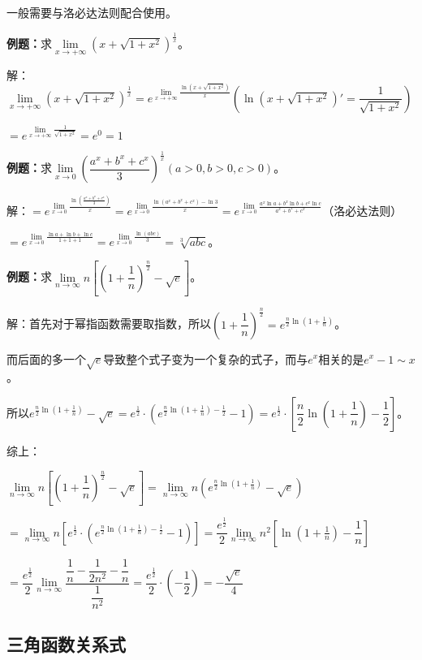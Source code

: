 \documentclass[UTF8, 12pt]{ctexart}
\begin{document}
一般需要与洛必达法则配合使用。

\textbf{例题：}求$\lim\limits_{x\to+\infty}(x+\sqrt{1+x^2})^{\frac{1}{x}}$。

解：$\lim\limits_{x\to+\infty}(x+\sqrt{1+x^2})^{\frac{1}{x}}=e^{\lim\limits_{x\to+\infty}\frac{\ln(x+\sqrt{1+x^2})}{x}} \left(\ln(x+\sqrt{1+x^2})'=\dfrac{1}{\sqrt{1+x^2}}\right)$\medskip

$=e^{\lim\limits_{x\to+\infty}\frac{1}{\sqrt{1+x^2}}}=e^0=1$

\textbf{例题：}求$\lim\limits_{x\to 0}\left(\dfrac{a^x+b^x+c^x}{3}\right)^{\frac{1}{x}}(a>0,b>0,c>0)$。\medskip

解：$=e^{\lim\limits_{x\to 0}\frac{\ln\left(\frac{a^x+b^x+c^x}{3}\right)}{x}}=e^{\lim\limits_{x\to 0}\frac{\ln(a^x+b^x+c^x)-\ln 3}{x}}=e^{\lim\limits_{x\to 0}\frac{a^x\ln a+b^x\ln b+c^x\ln c}{a^x+b^x+c^x}}$（洛必达法则）

$=e^{\lim\limits_{x\to 0}\frac{\ln a+\ln b+\ln c}{1+1+1}}=e^{\lim\limits_{x\to 0}\frac{\ln(abc)}{3}}=\sqrt[3]{abc}$。\medskip

\textbf{例题：}求$\lim\limits_{n\to\infty}n\left[\left(1+\dfrac{1}{n}\right)^{\frac{n}{2}}-\sqrt{e}\right]$。

解：首先对于幂指函数需要取指数，所以$\left(1+\dfrac{1}{n}\right)^{\frac{n}{2}}=e^{\frac{n}{2}\ln(1+\frac{1}{n})}$。\medskip

而后面的多一个$\sqrt{e}$导致整个式子变为一个复杂的式子，而与$e^x$相关的是$e^x-1\sim x$。

所以$e^{\frac{n}{2}\ln(1+\frac{1}{n})}-\sqrt{e}=e^{\frac{1}{2}}\cdot\left(e^{\frac{n}{2}\ln(1+\frac{1}{n})-\frac{1}{2}}-1\right)=e^{\frac{1}{2}}\cdot\left[\dfrac{n}{2}\ln(1+\dfrac{1}{n})-\dfrac{1}{2}\right]$。

综上：

$\lim\limits_{n\to\infty}n\left[\left(1+\dfrac{1}{n}\right)^{\frac{n}{2}}-\sqrt{e}\right]=\lim\limits_{n\to\infty}n\left(e^{\frac{n}{2}\ln(1+\frac{1}{n})}-\sqrt{e}\right)$ \medskip

$=\lim\limits_{n\to\infty}n\left[e^{\frac{1}{2}}\cdot\left(e^{\frac{n}{2}\ln(1+\frac{1}{n})-\frac{1}{2}}-1\right)\right]=\dfrac{e^{\frac{1}{2}}}{2}\lim\limits_{n\to\infty}n^2\left[\ln\left(1+\frac{1}{n}\right)-\dfrac{1}{n}\right]$

$=\dfrac{e^{\frac{1}{2}}}{2}\lim\limits_{n\to\infty}\dfrac{\dfrac{1}{n}-\dfrac{1}{2n^2}-\dfrac{1}{n}}{\dfrac{1}{n^2}}=\dfrac{e^{\frac{1}{2}}}{2}\cdot\left(-\dfrac{1}{2}\right)=-\dfrac{\sqrt{e}}{4}$

\subsection{三角函数关系式}
\end{document}
